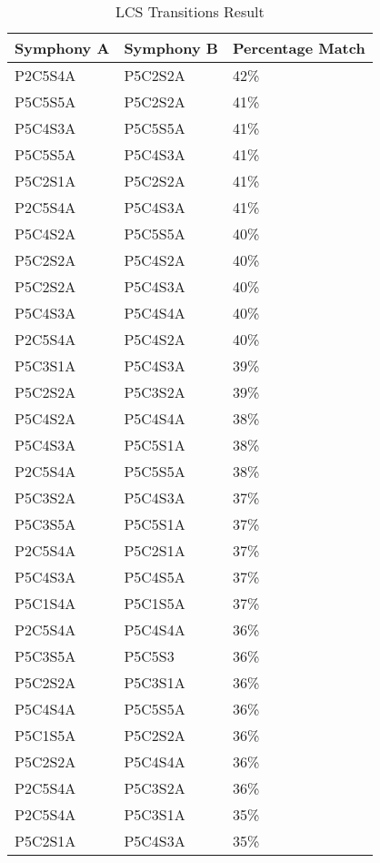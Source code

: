\begin{longtable}{|l|l|l|}
\caption{LCS  Transitions Result}
\label{my-label}\\
\hline
Symphony A & Symphony B & Percentage Match \\ \hline
\endfirsthead
%
\endhead
%
P2C5S4A & P5C2S2A & 42\% \\ \hline
P5C5S5A & P5C2S2A & 41\% \\ \hline
P5C4S3A & P5C5S5A & 41\% \\ \hline
P5C5S5A & P5C4S3A & 41\% \\ \hline
P5C2S1A & P5C2S2A & 41\% \\ \hline
P2C5S4A & P5C4S3A & 41\% \\ \hline
P5C4S2A & P5C5S5A & 40\% \\ \hline
P5C2S2A & P5C4S2A & 40\% \\ \hline
P5C2S2A & P5C4S3A & 40\% \\ \hline
P5C4S3A & P5C4S4A & 40\% \\ \hline
P2C5S4A & P5C4S2A & 40\% \\ \hline
P5C3S1A & P5C4S3A & 39\% \\ \hline
P5C2S2A & P5C3S2A & 39\% \\ \hline
P5C4S2A & P5C4S4A & 38\% \\ \hline
P5C4S3A & P5C5S1A & 38\% \\ \hline
P2C5S4A & P5C5S5A & 38\% \\ \hline
P5C3S2A & P5C4S3A & 37\% \\ \hline
P5C3S5A & P5C5S1A & 37\% \\ \hline
P2C5S4A & P5C2S1A & 37\% \\ \hline
P5C4S3A & P5C4S5A & 37\% \\ \hline
P5C1S4A & P5C1S5A & 37\% \\ \hline
P2C5S4A & P5C4S4A & 36\% \\ \hline
P5C3S5A & P5C5S3 & 36\% \\ \hline
P5C2S2A & P5C3S1A & 36\% \\ \hline
P5C4S4A & P5C5S5A & 36\% \\ \hline
P5C1S5A & P5C2S2A & 36\% \\ \hline
P5C2S2A & P5C4S4A & 36\% \\ \hline
P2C5S4A & P5C3S2A & 36\% \\ \hline
P2C5S4A & P5C3S1A & 35\% \\ \hline
P5C2S1A & P5C4S3A & 35\% \\ \hline
\end{longtable}

